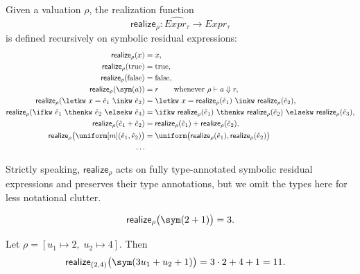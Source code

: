 \begin{definition}[Realization]
Given a
valuation $\rho$, the realization function
\[
  \mathsf{realize}_\rho :
  \widehat{Expr_\tau}\to Expr_\tau
\]
is defined recursively on symbolic residual expressions:
  \begin{align*}
    \mathsf{realize}_\rho(x)
    &=
    x,\\
    \mathsf{realize}_\rho(\text{true})
    &=
    \text{true},\\
    \mathsf{realize}_\rho(\text{false})
    &=
    \text{false},\\
    \mathsf{realize}_\rho(\sym(a))
    &=
    r
    \qquad
    \text{whenever } \rho \vdash a \Downarrow r,\\
    \mathsf{realize}_\rho(\letkw\ x=\hat e_1\ \inkw\ \hat e_2)
    &=
    \letkw\ x=\mathsf{realize}_\rho(\hat e_1)
    \ \inkw\ \mathsf{realize}_\rho(\hat e_2),\\
    \mathsf{realize}_\rho(
      \ifkw\ \hat e_1\ \thenkw\ \hat e_2\ \elsekw\ \hat e_3)
    &=
    \ifkw\ \mathsf{realize}_\rho(\hat e_1)
    \ \thenkw\ \mathsf{realize}_\rho(\hat e_2)
    \ \elsekw\ \mathsf{realize}_\rho(\hat e_3),\\
    \mathsf{realize}_\rho(\hat e_1 + \hat e_2)
    &=
    \mathsf{realize}_\rho(\hat e_1)
    +
    \mathsf{realize}_\rho(\hat e_2),\\
    \mathsf{realize}_\rho
      \bigl(\uniform[m](\hat e_1,\hat e_2)\bigr)
    &=
    \uniform\bigl(
      \mathsf{realize}_\rho(\hat e_1),
      \mathsf{realize}_\rho(\hat e_2)
    \bigr) \\
    \ldots
  \end{align*}
\end{definition}

Strictly speaking, $\mathsf{realize}_{\rho}$ acts on fully type-annotated symbolic residual expressions and preserves their type annotations, but we omit the types here for less notational clutter.

\begin{example}
  \[
    \mathsf{realize}_{\rho}\bigl(\sym(2+1)\bigr)
    =
    3.
  \]
\end{example}

\begin{example}
  Let $\rho=[u_1\mapsto 2,\;u_2\mapsto 4]$. Then
  \[
    \begin{aligned}
      \mathsf{realize}_{(2,4)}
      \bigl(\sym(3u_1+u_2+1)\bigr)
      &=
      3 \cdot 2 + 4 + 1 = 11.
    \end{aligned}
  \]
\end{example}

